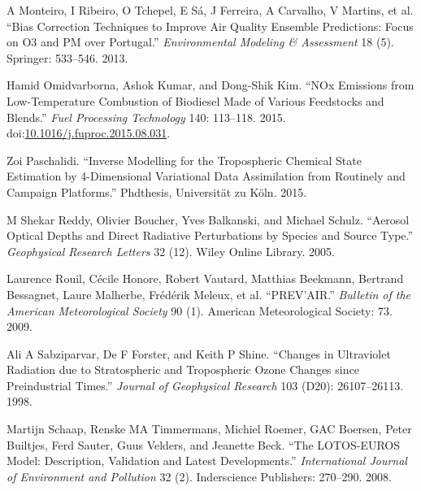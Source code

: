 \documentclass[9pt]{report}
\begin{document}
{\begin{thebibliography}{32}
A Monteiro, I Ribeiro, O Tchepel, E S\'{a}, J Ferreira, A Carvalho, V Martins, et al. \textquotedblleft{}Bias Correction Techniques to Improve Air Quality Ensemble Predictions: Focus on O3 and PM over Portugal.\textquotedblright{} \emph{Environmental Modeling \& Assessment} 18 (5). Springer: 533–546. 2013.\label{monteiro2013bias}%

Hamid Omidvarborna, Ashok Kumar, and Dong-Shik Kim. \textquotedblleft{}NOx Emissions from Low-Temperature Combustion of Biodiesel Made of Various Feedstocks and Blends.\textquotedblright{} \emph{Fuel Processing Technology} 140: 113–118. 2015. doi:\href{https://dx.doi.org/10.1016/j.fuproc.2015.08.031}{10.1016/j.fuproc.2015.08.031}.\label{omidvarborna2015113}%

Zoi Paschalidi. \textquotedblleft{}Inverse Modelling for the Tropospheric Chemical State Estimation by 4-Dimensional Variational Data Assimilation from Routinely and Campaign Platforms.\textquotedblright{} Phdthesis, Universit\"{a}t zu K\"{o}ln. 2015.\label{paschalidi2015inverse}%

M Shekar Reddy, Olivier Boucher, Yves Balkanski, and Michael Schulz. \textquotedblleft{}Aerosol Optical Depths and Direct Radiative Perturbations by Species and Source Type.\textquotedblright{} \emph{Geophysical Research Letters} 32 (12). Wiley Online Library. 2005.\label{reddy2005aerosol}%

Laurence Rouil, C\'{e}cile Honore, Robert Vautard, Matthias Beekmann, Bertrand Bessagnet, Laure Malherbe, Fr\'{e}d\'{e}rik Meleux, et al. \textquotedblleft{}PREV’AIR.\textquotedblright{} \emph{Bulletin of the American Meteorological Society} 90 (1). American Meteorological Society: 73. 2009.\label{rouil2009prev}%

Ali A Sabziparvar, De F Forster, and Keith P Shine. \textquotedblleft{}Changes in Ultraviolet Radiation due to Stratospheric and Tropospheric Ozone Changes since Preindustrial Times.\textquotedblright{} \emph{Journal of Geophysical Research} 103 (D20): 26107–26113. 1998.\label{sabziparvar1998changes}%

Martijn Schaap, Renske MA Timmermans, Michiel Roemer, GAC Boersen, Peter Builtjes, Ferd Sauter, Guus Velders, and Jeanette Beck. \textquotedblleft{}The LOTOS-EUROS Model: Description, Validation and Latest Developments.\textquotedblright{} \emph{International Journal of Environment and Pollution} 32 (2). Inderscience Publishers: 270–290. 2008.\label{schaap2008lotos}%


\end{thebibliography}}
\end{document}
